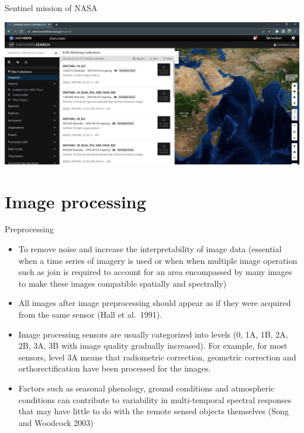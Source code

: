 \documentclass[10pt,dvipsnames,ignorenonframetext,aspectratio=169]{beamer}
\providecommand{\tightlist}{%
  \setlength{\itemsep}{0pt}\setlength{\parskip}{0pt}}
\begin{document}
\begin{frame}{Sentinel mission of NASA}
\protect\hypertarget{sentinel-mission-of-nasa}{}
\begin{center}\includegraphics[width=0.85\linewidth]{../images/earthdata_nasa_sentinel_data_viewer} \end{center}
\end{frame}

\hypertarget{image-processing}{%
\section{Image processing}\label{image-processing}}

\begin{frame}{Preprocessing}
\protect\hypertarget{preprocessing}{}
\begin{itemize}
\tightlist
\item
  To remove noise and increase the interpretability of image data
  (essential when a time series of imagery is used or when when multiple
  image operation such as join is required to account for an area
  encompassed by many images to make these images compatible spatially
  and spectrally)
\item
  All images after image preprocessing should appear as if they were
  acquired from the same sensor (Hall et al.~1991).
\item
  Image processing sensors are usually categorized into levels (0, 1A,
  1B, 2A, 2B, 3A, 3B with image quality gradually increased). For
  example, for most sensors, level 3A means that radiometric correction,
  geometric correction and orthorectification have been processed for
  the images.
\item
  Factors such as seasonal phenology, ground conditions and atmospheric
  conditions can contribute to variability in multi-temporal spectral
  responses that may have little to do with the remote sensed objects
  themselves (Song and Woodcock 2003)
\end{itemize}
\end{frame}
\end{document}
